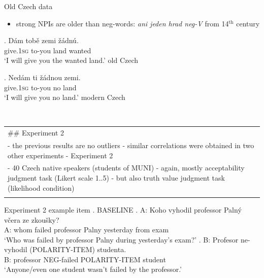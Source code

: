 \documentclass[
  ignorenonframetext,
]{beamer}
\providecommand{\tightlist}{%
  \setlength{\itemsep}{0pt}\setlength{\parskip}{0pt}}\usepackage{longtable,booktabs,array}
\newcommand{\cond}[1]{\textsc{#1}}
\begin{document}
\begin{frame}
\begin{block}{Old Czech data}
\protect\hypertarget{old-czech-data}{}
\begin{itemize}
\tightlist
\item
  strong NPIs are older than neg-words: \emph{ani jeden hrad neg-V} from
  14\(^{\textrm{th}}\) century
\end{itemize}

\exg. Dám tobě zemi žádnú.\\
give.\textsc{1sg} to-you land wanted\\
`I will give you the wanted land.' \hfill old Czech

\exg. Nedám ti žádnou zemi.\\
give.\textsc{1sg} to-you no land\\
`I will give you no land.' \hfill modern Czech

~

\begin{longtable}[]{@{}
  >{\raggedright\arraybackslash}p{}@{}}
\toprule\noalign{}
\endhead
\#\# Experiment 2 \\
- the previous results are no outliers - similar correlations were
obtained in two other experiments - Experiment 2 \\
- 40 Czech native speakers (students of MUNI) - again, mostly
acceptability judgment task (Likert scale 1..5) - but also truth value
judgment task (likelihood condition) \\
\bottomrule\noalign{}
\end{longtable}

\begin{block}{Experiment 2 example item}
\protect\hypertarget{experiment-2-example-item}{}
\ex. \cond{BASELINE} \ag. A: Koho vyhodil professor Palný včera ze
zkoušky?\\
A: whom failed professor Palny yesterday from exam\\
`Who was failed by professor Palny during yesterday's exam?' \bg. B:
Profesor ne-vyhodil (POLARITY-ITEM) studenta.\\
B: professor NEG-failed POLARITY-ITEM student\\
`Anyone/even one student wasn't failed by the professor.'

~
\end{block}
\end{block}
\end{frame}
\end{document}
